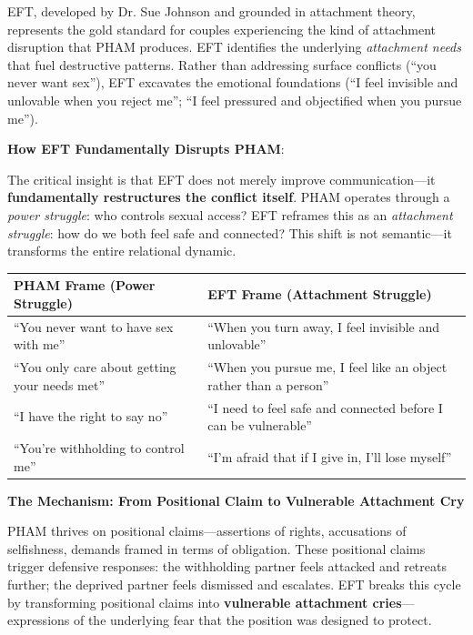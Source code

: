 \documentclass[12pt, letterpaper]{article}
\begin{document}
EFT, developed by Dr. Sue Johnson and grounded in attachment theory, represents the gold standard for couples experiencing the kind of attachment disruption that PHAM produces. EFT identifies the underlying \textit{attachment needs} that fuel destructive patterns. Rather than addressing surface conflicts (``you never want sex''), EFT excavates the emotional foundations (``I feel invisible and unlovable when you reject me''; ``I feel pressured and objectified when you pursue me'').

\textbf{How EFT Fundamentally Disrupts PHAM}:

The critical insight is that EFT does not merely improve communication---it \textbf{fundamentally restructures the conflict itself}. PHAM operates through a \textit{power struggle}: who controls sexual access? EFT reframes this as an \textit{attachment struggle}: how do we both feel safe and connected? This shift is not semantic---it transforms the entire relational dynamic.

\begin{center}
\begin{tabular}{|p{2.5in}|p{2.5in}|}
\hline
\textbf{PHAM Frame (Power Struggle)} & \textbf{EFT Frame (Attachment Struggle)} \\
\hline
``You never want to have sex with me'' & ``When you turn away, I feel invisible and unlovable'' \\
\hline
``You only care about getting your needs met'' & ``When you pursue me, I feel like an object rather than a person'' \\
\hline
``I have the right to say no'' & ``I need to feel safe and connected before I can be vulnerable'' \\
\hline
``You're withholding to control me'' & ``I'm afraid that if I give in, I'll lose myself'' \\
\hline
\end{tabular}
\end{center}

\textbf{The Mechanism: From Positional Claim to Vulnerable Attachment Cry}

PHAM thrives on positional claims---assertions of rights, accusations of selfishness, demands framed in terms of obligation. These positional claims trigger defensive responses: the withholding partner feels attacked and retreats further; the deprived partner feels dismissed and escalates. EFT breaks this cycle by transforming positional claims into \textbf{vulnerable attachment cries}---expressions of the underlying fear that the position was designed to protect.
\end{document}

